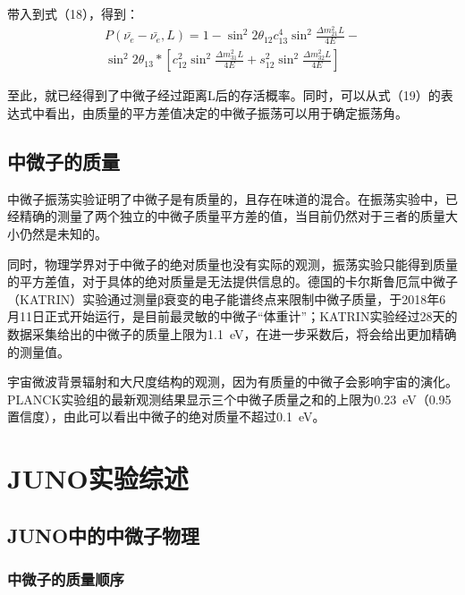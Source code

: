 \documentclass[10pt,a4paper]{article}
\begin{document}
带入到式（18），得到：
\begin{equation}
\begin{split}
P(\bar{\nu_e}-\bar{\nu_e},L)=1-{\sin^2{2\theta_{12}}} c_{13}^4\sin^2{\frac{\Delta{m_{21}^2}L}{4E}}-\\
\sin^2{2\theta_{13}} *[c_{12}^2\sin^2{\frac{\Delta{m_{31}^2}L}{4E}}+s_{12}^2\sin^2{\frac{\Delta{m_{32}^2}L}{4E}}]
\end{split}
\end{equation}

至此，就已经得到了中微子经过距离L后的存活概率。同时，可以从式（19）的表达式中看出，由质量的平方差值决定的中微子振荡可以用于确定振荡角。
\newpage
\subsection{中微子的质量}\label{sub:sysover}

中微子振荡实验证明了中微子是有质量的，且存在味道的混合。在振荡实验中，已经精确的测量了两个独立的中微子质量平方差的值，当目前仍然对于三者的质量大小仍然是未知的。

同时，物理学界对于中微子的绝对质量也没有实际的观测，振荡实验只能得到质量的平方差值，对于具体的绝对质量是无法提供信息的。德国的卡尔斯鲁厄氚中微子（KATRIN）实验通过测量β衰变的电子能谱终点来限制中微子质量，于2018年6月11日正式开始运行，是目前最灵敏的中微子“体重计”；KATRIN实验经过28天的数据采集给出的中微子的质量上限为\SI{1.1}{eV}，在进一步采数后，将会给出更加精确的测量值。

宇宙微波背景辐射和大尺度结构的观测，因为有质量的中微子会影响宇宙的演化。PLANCK实验组的最新观测结果显示三个中微子质量之和的上限为\SI{0.23}{eV}（0.95置信度），由此可以看出中微子的绝对质量不超过\SI{0.1}{eV}。

\newpage
\section{JUNO实验综述} \label{sysdes}%

\subsection{JUNO中的中微子物理}\label{sub:sysover}
\subsubsection{中微子的质量顺序}\label{sub:sysover}
\end{document}
